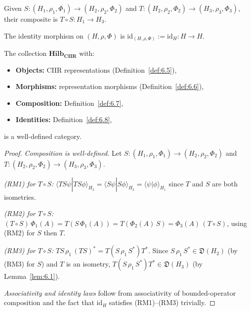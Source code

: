 \begin{definition}
\label{def:6.7}
Given $S : (H_1, \rho_1, \Phi_1) \to (H_2, \rho_2, \Phi_2)$ and
$T : (H_2, \rho_2, \Phi_2) \to (H_3, \rho_3, \Phi_3)$, their
composite is $T \circ S : H_1 \to H_3$.
\end{definition}

\begin{definition}
\label{def:6.8}
The identity morphism on $(H, \rho, \Phi)$ is
$\mathrm{id}_{(H,\rho,\Phi)} := \mathrm{id}_H : H \to H$.
\end{definition}

\begin{theorem}
\label{thm:6.2}
The collection $\mathbf{Hilb_{CIIR}}$ with:
\begin{itemize}
  \item \textbf{Objects:} CIIR representations
    (Definition~\ref{def:6.5}),
  \item \textbf{Morphisms:} representation morphisms
    (Definition~\ref{def:6.6}),
  \item \textbf{Composition:} Definition~\ref{def:6.7},
  \item \textbf{Identities:} Definition~\ref{def:6.8},
\end{itemize}
is a well-defined category.
\end{theorem}

\begin{proof}
\textit{Composition is well-defined.}
Let $S : (H_1, \rho_1, \Phi_1) \to (H_2, \rho_2, \Phi_2)$ and
$T : (H_2, \rho_2, \Phi_2) \to (H_3, \rho_3, \Phi_3)$.

\emph{(RM1) for $T \circ S$:}
$\langle T S\psi | T S\phi\rangle_{H_3}
= \langle S\psi | S\phi\rangle_{H_2}
= \langle \psi | \phi\rangle_{H_1}$
since $T$ and $S$ are both isometries.

\emph{(RM2) for $T \circ S$:}
$(T \circ S)\,\Phi_1(A)
= T(S\,\Phi_1(A))
= T(\Phi_2(A)\,S)
= \Phi_3(A)\,(T \circ S)$,
using (RM2) for $S$ then $T$.

\emph{(RM3) for $T \circ S$:}
$T S\,\rho_1\,(T S)^* = T(S\,\rho_1\,S^*)T^*$.
Since $S\,\rho_1\,S^* \in \mathfrak{D}(H_2)$ (by (RM3) for $S$)
and $T$ is an isometry, $T(S\,\rho_1\,S^*)T^* \in
\mathfrak{D}(H_3)$ (by Lemma~\ref{lem:6.1}).

\textit{Associativity and identity laws}
follow from associativity of bounded-operator composition and the fact
that $\mathrm{id}_H$ satisfies (RM1)--(RM3) trivially.
\end{proof}

